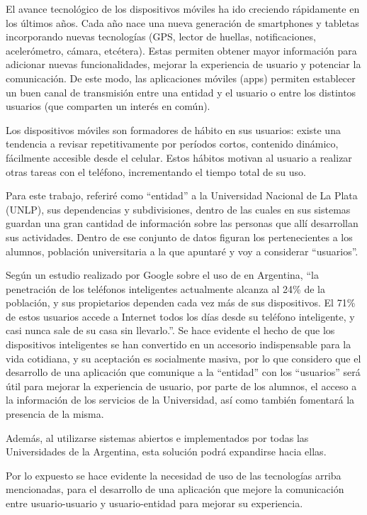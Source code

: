 El avance tecnológico de los dispositivos móviles ha ido creciendo rápidamente
en los últimos años. Cada año nace una nueva generación de smartphones y
tabletas incorporando nuevas tecnologías (GPS, lector de huellas,
notificaciones, acelerómetro, cámara, etcétera). Estas permiten obtener mayor
información para adicionar nuevas funcionalidades, mejorar la experiencia de
usuario y potenciar la comunicación. De este modo, las aplicaciones móviles
(apps) permiten establecer un buen canal de transmisión entre una entidad y el
usuario o entre los distintos usuarios (que comparten un interés en común).

Los dispositivos móviles son formadores de hábito en sus usuarios: existe una tendencia a revisar repetitivamente por períodos cortos, contenido dinámico, fácilmente accesible desde el celular\cite{oulasvirta2012habits}.
Estos hábitos motivan al usuario a realizar otras tareas con el teléfono, incrementando el tiempo total de su uso.

Para este trabajo, referiré como “entidad” a la Universidad Nacional de La Plata
(UNLP), sus dependencias y subdivisiones, dentro de las cuales en sus sistemas guardan una gran cantidad
de información sobre las personas que allí desarrollan sus actividades. Dentro
de ese conjunto de datos figuran los pertenecientes a los alumnos, población
universitaria a la que apuntaré y voy a considerar “usuarios”.

Según un estudio realizado por Google sobre el uso de 
en Argentina, \cite{GoogleEstudioSmartphones} ``la penetración de los teléfonos
inteligentes actualmente alcanza al 24\% de la población, y sus propietarios
dependen cada vez más de sus dispositivos. El 71\% de estos usuarios accede a
Internet todos los días desde su teléfono inteligente, y casi nunca sale de su
casa sin llevarlo.''. Se hace evidente el hecho de que los dispositivos
inteligentes se han convertido en un accesorio indispensable para la vida
cotidiana, y su aceptación es socialmente masiva, por lo que considero que el
desarrollo de una aplicación que comunique a la “entidad” con los “usuarios”
será útil para mejorar la experiencia de usuario, por parte de los alumnos, el
acceso a la información de los servicios de la Universidad, así como también
fomentará la presencia de la misma.

Además, al utilizarse sistemas abiertos e implementados por todas las
Universidades de la Argentina, esta solución podrá expandirse hacia ellas.

Por lo expuesto se hace evidente la necesidad de uso de
las tecnologías arriba mencionadas, para el desarrollo de una aplicación que
mejore la comunicación entre usuario-usuario y usuario-entidad para mejorar su
experiencia.
